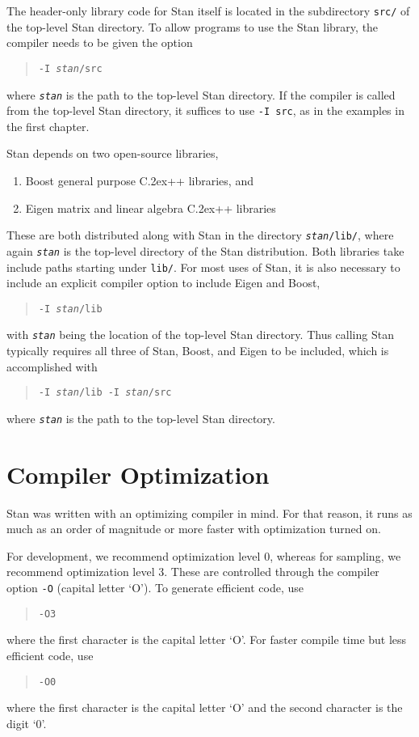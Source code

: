 \documentclass[10pt]{report}
\newcommand{\Stan}{Stan\xspace}
\newcommand*{\Cpp}{C\raise.2ex\hbox{\footnotesize ++}\xspace} %
\newcommand{\code}[1]{{\tt #1}}
\begin{document}
The header-only library code for \Stan itself is located in the
subdirectory \code{src/} of the top-level \Stan directory.  To allow
programs to use the \Stan library, the compiler needs to be given the
option 
%
\begin{quote}
\code{-I {\slshape stan}/src} 
\end{quote}
%
where \code{\slshape stan} is the
path to the top-level Stan directory.  If the compiler is called from the
top-level Stan directory, it suffices to use \code{-I src}, as in the
examples in the first chapter.

\Stan depends on two open-source libraries,
%
\begin{enumerate}
\item Boost general purpose \Cpp libraries, and 
\item Eigen matrix and linear algebra \Cpp libraries
\end{enumerate}
%
These are both distributed along with \Stan in the directory
\code{{\slshape stan}/lib/}, where again \code{\slshape stan} is the
top-level directory of the \Stan distribution.  Both libraries take
include paths starting under \code{lib/}.  For most uses of \Stan, it
is also necessary to include an explicit compiler option to include
Eigen and Boost,
%
\begin{quote}
\code{-I {\slshape stan}/lib}
\end{quote}
%
with \code{\slshape stan} being the location of the top-level \Stan
directory.  Thus calling \Stan typically requires all three of \Stan,
Boost, and Eigen to be included, which is accomplished with
%
\begin{quote}
\code{-I {\slshape stan}/lib -I {\slshape stan}/src}
\end{quote}
%
where \code{\slshape stan} is the path to the top-level \Stan directory.


\section{Compiler Optimization}

Stan was written with an optimizing compiler in mind.  For
that reason, it runs as much as an order of magnitude or more
faster with optimization turned on.  

For development, we recommend optimization level 0, whereas for
sampling, we recommend optimization level 3.  These are controlled
through the compiler option \code{-O} (capital letter `O').  To
generate efficient code, use
%
\begin{quote}
\code{-O3}
\end{quote}
%
where the first character is the capital letter `O'.
For faster compile time but less efficient code, use
%
\begin{quote}
\code{-O0}
\end{quote}
%
where the first character is the capital letter `O' and
the second character is the digit `0'.
\end{document}
